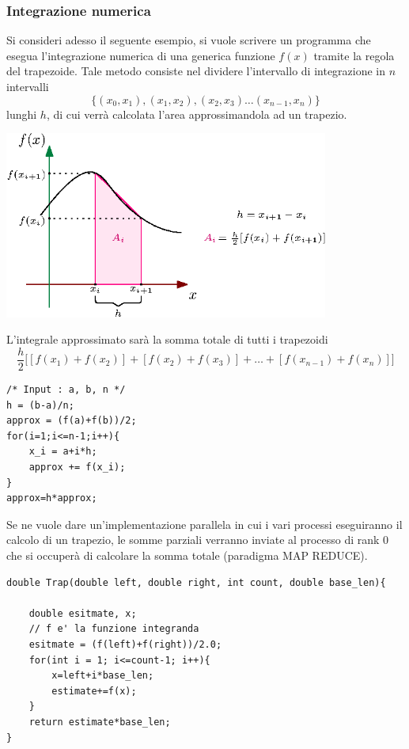 \documentclass[10pt, letterpaper]{report}
\begin{document}
\subsubsection{Integrazione numerica}\label{integrale}
Si consideri adesso il seguente esempio, si vuole scrivere un programma che esegua l'integrazione numerica 
di una generica funzione $f(x)$ tramite la regola del trapezoide. Tale metodo consiste nel dividere l'intervallo 
di integrazione in $n$ intervalli $$\{(x_0,x_1),(x_1,x_2),(x_2,x_3)\dots (x_{n-1},x_n)\}$$ lunghi $h$,
 di cui verrà calcolata l'area approssimandola ad un trapezio.
 \begin{center}
    \includegraphics[width=0.8\textwidth]{images/trapezio.eps}
 \end{center}
L'integrale approssimato sarà la somma totale di tutti i trapezoidi 
$$ \frac{h}{2}\Big[[f(x_1)+f(x_{2})]+[f(x_2)+f(x_{3})]+\dots +[f(x_{n-1})+f(x_{n})]\Big]$$
\begin{lstlisting}[style=CStyle]
/* Input : a, b, n */
h = (b-a)/n;
approx = (f(a)+f(b))/2;
for(i=1;i<=n-1;i++){
    x_i = a+i*h; 
    approx += f(x_i);
}
approx=h*approx;
\end{lstlisting}
Se ne vuole dare un'implementazione parallela in cui i vari processi eseguiranno il calcolo di un 
trapezio, le somme parziali verranno inviate al processo di rank 0 che si occuperà di calcolare 
la somma totale (paradigma MAP REDUCE).
\begin{lstlisting}[style=CStyle]
double Trap(double left, double right, int count, double base_len){

    double esitmate, x;
    // f e' la funzione integranda
    esitmate = (f(left)+f(right))/2.0;
    for(int i = 1; i<=count-1; i++){
        x=left+i*base_len;
        estimate+=f(x);
    }
    return estimate*base_len;
}
\end{lstlisting}
\end{document}
